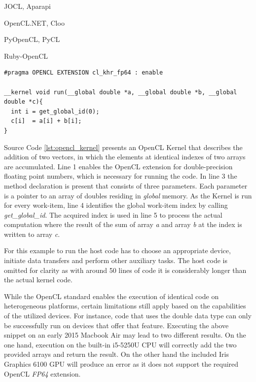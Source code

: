 \begin{description}[align=left,labelwidth=1.5cm]
  \item [Java] JOCL, Aparapi
  \item [.NET] OpenCL.NET, Cloo
  \item [Python] PyOpenCL, PyCL
  \item [Ruby] Ruby-OpenCL
\end{description}

\begin{minipage}{\linewidth}

\begin{lstlisting}[caption=OpenCL Vector Addition Kernel,captionpos=b,label={lst:opencl_kernel}]
#pragma OPENCL EXTENSION cl_khr_fp64 : enable

__kernel void run(__global double *a, __global double *b, __global double *c){
  int i = get_global_id(0);
  c[i]  = a[i] + b[i];
}
\end{lstlisting}
\end{minipage}
Source Code \ref{lst:opencl_kernel} presents an OpenCL Kernel that describes the addition of two vectors, in which the elements at identical indexes of two arrays are accumulated. Line 1 enables the OpenCL extension for double-precision floating point numbers, which is necessary for running the code. In line 3 the method declaration is present that consists of three parameters. Each parameter is a pointer to an array of doubles residing in \textit{global} memory. As the Kernel is run for every work-item, line 4 identifies the global work-item index by calling \textit{get\_global\_id}. The acquired index is used in line 5 to process the actual computation where the result of the sum of array \textit{a} and array \textit{b} at the index is written to array \textit{c}.

For this example to run the host code has to choose an appropriate device, initiate data transfers and perform other auxiliary tasks. The host code is omitted for clarity as with around 50 lines of code it is considerably longer than the actual kernel code. 

While the OpenCL standard enables the execution of identical code on heterogeneous platforms, certain limitations still apply based on the capabilities of the utilized devices. For instance, code that uses the double data type can only be successfully run on devices that offer that feature. Executing the above snippet on an early 2015 Macbook Air may lead to two different results. On the one hand, execution on the built-in i5-5250U CPU will correctly add the two provided arrays and return the result. On the other hand the included Iris Graphics 6100 GPU will produce an error as it does not support the required OpenCL \textit{FP64} extension.


